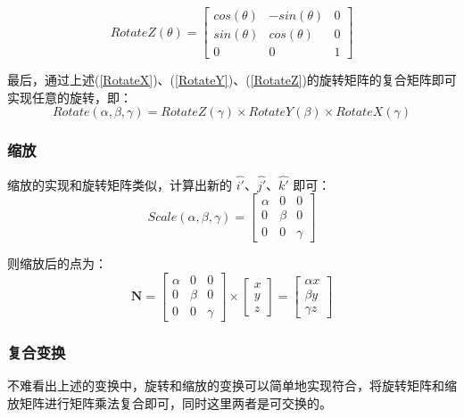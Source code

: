 \documentclass[12pt,oneside,a4paper]{ctexart}
\begin{document}
\begin{equation}
	RotateZ(\theta)=\begin{bmatrix}
		cos(\theta) & -sin(\theta) & 0 \\
		sin(\theta) & cos(\theta)  & 0 \\
		0           & 0            & 1
	\end{bmatrix}
	\label{RotateZ}
\end{equation}

最后，通过上述(\ref{RotateX})、(\ref{RotateY})、(\ref{RotateZ})的旋转矩阵的复合矩阵即可实现任意的旋转，即：
\begin{equation*}
	Rotate(\alpha,\beta,\gamma)=RotateZ(\gamma)\times{}RotateY(\beta)\times{}RotateX(\gamma)
\end{equation*}
\subsubsection{缩放}

缩放的实现和旋转矩阵类似，计算出新的 $\hat{i'}$、$\hat{j'}$、$\hat{k'}$ 即可：
\begin{equation*}
	Scale(\alpha,\beta,\gamma)=\begin{bmatrix}
		\alpha & 0     & 0      \\
		0      & \beta & 0      \\
		0      & 0     & \gamma
	\end{bmatrix}
\end{equation*}

则缩放后的点为：
\begin{equation*}
	\mathbf{N}=\begin{bmatrix}
		\alpha & 0     & 0      \\
		0      & \beta & 0      \\
		0      & 0     & \gamma
	\end{bmatrix}
	\times
	\begin{bmatrix}
		x \\
		y \\
		z
	\end{bmatrix}=
	\begin{bmatrix}
		\alpha{}x \\
		\beta{}y  \\
		\gamma{}z
	\end{bmatrix}
\end{equation*}

\subsubsection{复合变换}
不难看出上述的变换中，旋转和缩放的变换可以简单地实现符合，将旋转矩阵和缩放矩阵进行矩阵乘法复合即可，同时这里两者是可交换的。
\end{document}
